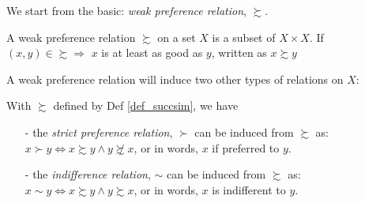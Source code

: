 We start from the basic: \textit{weak preference relation}, $\succsim$.
\begin{definition}\label{def_succsim}
    A weak preference relation $\succsim$ on a set $X$ is a subset of $X\times X$. If $(x,y)\in \succsim \Rightarrow$ $x$ is at least as good as $y$, written as $x\succsim y$
\end{definition}

A weak preference relation will induce two other types of relations on $X$:
\begin{definition}
    With $\succsim$ defined by Def \ref{def_succsim}, we have
    \begin{enumerate}
        \item[-] the \textit{strict preference relation}, $\succ$ can be induced from $\succsim$ as: $x\succ y\Leftrightarrow x\succsim y \wedge y\not\succsim x$,
        or in words, $x$ if preferred to $y$.
        \item[-] the \textit{indifference relation}, $\sim$ can be induced from $\succsim$ as: $x\sim y \Leftrightarrow x\succsim y \wedge y\succsim x$, or in words, $x$ is indifferent to $y$.
    \end{enumerate}
\end{definition}
